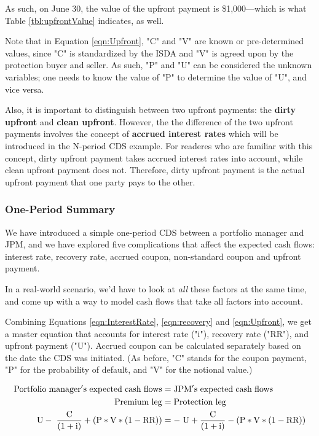 \documentclass[article]{jss}
\begin{document}
As such, on June 30, the value of the upfront payment is \$1,000---which is what Table \ref{tbl:upfrontValue} indicates, as well.

Note that in Equation \ref{eqn:Upfront}, "C" and "V" are known or pre-determined values, since "C" is standardized by the ISDA and "V" is agreed upon by the protection buyer and seller. As such, "P" and "U" can be considered the unknown variables; one needs to know the value of "P" to determine the value of "U", and vice versa.

Also, it is important to distinguish between two upfront payments: the \textbf{dirty upfront} and \textbf{clean upfront}. However, the the difference of the two upfront payments involves the concept of \textbf{accrued interest rates} which will be introduced in the N-period CDS example. For readeres who are familiar with this concept, dirty upfront payment takes accrued interest rates into account, while clean upfront payment does not. Therefore, dirty upfront payment is the actual upfront payment that one party pays to the other.

\subsubsection{One-Period Summary}
\label{sec:Sum}

We have introduced a simple one-period CDS between a portfolio manager and JPM, and we have explored five complications that affect the expected cash flows: interest rate, recovery rate, accrued coupon, non-standard coupon and upfront payment.

In a real-world scenario, we'd have to look at \emph{all} these factors at the same time, and come up with a way to model cash flows that take all factors into account.

Combining Equations \ref{eqn:InterestRate}, \ref{eqn:recovery} and \ref{eqn:Upfront}, we get a master equation that accounts for interest rate ("i"), recovery rate ("RR"), and upfront payment ("U"). Accrued coupon can be calculated separately based on the date the CDS was initiated. (As before, "C" stands for the coupon payment, "P" for the probability of default, and "V" for the notional value.)

\begin{align}
  \rm Portfolio\hspace{3pt}manager's\hspace{3pt}expected\hspace{3pt}cash\hspace{3pt}flows &= \rm JPM's\hspace{3pt}expected\hspace{3pt}cash\hspace{3pt}flows \\
  \rm Premium\hspace{3pt}leg &= \rm Protection\hspace{3pt}leg \\
  \rm U -\hspace{3pt}\frac{C}{(1 + i)} + (P * V * (1 - RR))  &= \rm -\hspace{3pt}U + \frac{C}{(1 + i)} - (P * V * (1 - RR)) 
\end{align}
\end{document}

